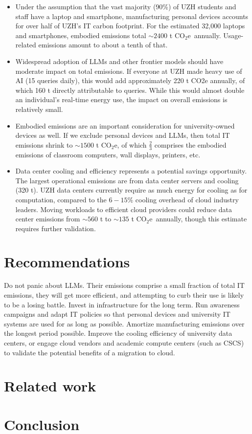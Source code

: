 \documentclass[11pt]{article}
\newcommand{\coe}{CO$_2$e}
\begin{document}
\begin{itemize}

\item Under the assumption that the vast majority (90\%) of UZH students and staff have a laptop and smartphone, manufacturing personal devices accounts for over half of UZH's IT carbon footprint. For the estimated 32,000 laptops and smartphones, embodied emissions total $\sim 2400$ t \coe\ annually. Usage-related emissions amount to about a tenth of that.

\item Widespread adoption of LLMs and other frontier models should have moderate impact on total emissions. If everyone at UZH made heavy use of AI (15 queries daily), this would add approximately 220 t CO2e annually, of which 160 t directly attributable to queries. While this would almost double an individual's real-time energy use, the impact on overall emissions is relatively small.

\item Embodied emissions are an important consideration for university-owned devices as well. If we exclude personal devices and LLMs, then total IT emissions shrink to $\sim 1500$ t \coe, of which $\frac{2}{3}$ comprises the embodied emissions of classroom computers, wall displays, printers, etc.

\item Data center cooling and efficiency represents a potential savings opportunity. The largest operational emissions are from data center servers and cooling (320 t). UZH data centers currently require as much energy for cooling as for computation, compared to the $6-15\%$ cooling overhead of cloud industry leaders. Moving workloads to efficient cloud providers could reduce data center emissions from $\sim 560$ t to $\sim 135$ t \coe\ annually, though this estimate requires further validation.

\end{itemize}

\section{Recommendations}
\label{sec:recommendations}

Do not panic about LLMs. Their emissions comprise a small fraction of total IT emissions, they will get more efficient, and attempting to curb their use is likely to be a losing battle.
Invest in infrastructure for the long term. Run awareness campaigns and adapt IT policies so that personal devices and university IT systems are used for as long as possible. Amortize manufacturing emissions over the longest period possible.
Improve the cooling efficiency of university data centers, or engage cloud vendors and academic compute centers (such as CSCS) to validate the potential benefits of a migration to cloud.



\section{Related work}
\label{sec:related:work}



\section{Conclusion}

\printbibliography
\end{document}
